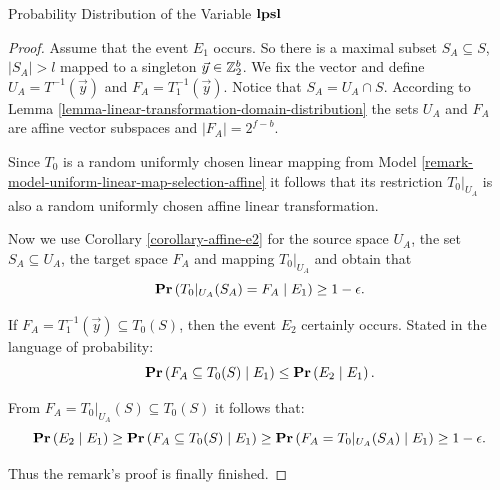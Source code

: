\begin{section}{Probability Distribution of the Variable \texorpdfstring{$\mathbf{lpsl}$}{lpsl}}
\begin{proof}
Assume that the event $E_1$ occurs. So there is a maximal subset $S_A \subseteq S$, $|S_A| > l$ mapped to a singleton $\vec{y} \in \mathbb{Z}_{2}^{b}$. We fix the vector and define $U_A = T^{-1}(\vec{y})$ and $F_A = T_1^{-1}(\vec{y})$. Notice that $S_A = U_A \cap S$. According to Lemma \ref{lemma-linear-transformation-domain-distribution} the sets $U_A$ and $F_A$ are affine vector subspaces and $|F_A| = 2 ^ {f - b}$.

Since $T_0$ is a random uniformly chosen linear mapping from Model \ref{remark-model-uniform-linear-map-selection-affine} it follows that its restriction $T_0|_{U_A}$ is also a random uniformly chosen affine linear transformation.

Now we use Corollary \ref{corollary-affine-e2} for the source space $U_A$, the set $S_A \subseteq U_A$, the target space $F_A$ and mapping $T_0|_{U_A}$ and obtain that 
\[
	\mathbf{Pr}\left(T_0|_{U_A}(S_A) = F_A \mid E_1\right) \geq 1 - \epsilon \text{.}
\]

If $F_A = T_1^{-1}(\vec{y}) \subseteq T_0(S)$, then the event $E_2$ certainly occurs. Stated in the language of probability:
\[
	\mathbf{Pr}\left(F_A \subseteq T_0(S) \mid E_1\right) \leq \mathbf{Pr}\left(E_2 \mid E_1\right) \text{.}
\]

From $F_A = T_0|_{U_A}(S) \subseteq T_0(S)$ it follows that:
\[
	\mathbf{Pr}\left(E_2 \mid E_1\right) \geq \mathbf{Pr}\left(F_A \subseteq T_0(S) \mid E_1\right) \geq \mathbf{Pr}\left(F_A = T_0|_{U_A}(S_A) \mid E_1\right) \geq 1 - \epsilon \text{.}
\]

Thus the remark's proof is finally finished.


\end{proof}
\end{section}
